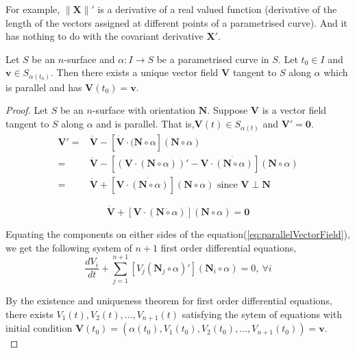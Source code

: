 	For example, $\|\mathbf{X}\|'$ is a derivative of a real valued function (derivative of the length of the vectors assigned at different points of a parametrised curve). And it has nothing to do with the covariant derivative $\mathbf{X}'$.

\begin{theorem}
	Let $S$ be an $n$-surface and $\alpha : I \to S$ be a parametrised curve in $S$. Let $t_0 \in I$ and $\mathbf{v} \in S_{\alpha(t_0)}$. Then there exists a unique vector field $\mathbf{V}$ tangent to $S$ along $\alpha$ which is parallel and has $\mathbf{V}(t_0) = \mathbf{v}$.
\end{theorem}
\begin{proof}
	Let $S$ be an $n$-surface with orientation $\mathbf{N}$. Suppose $\mathbf{V}$ is a vector field tangent to $S$ along $\alpha$ and is parallel. That is,$\mathbf{V}(t) \in S_{\alpha(t)}$ and $\mathbf{V}' = \mathbf{0}$.
\begin{align*}
	\mathbf{V}' = & \dot{\mathbf{V}} - \left[ \dot{\mathbf{V}} \cdot (\mathbf{N} \circ \alpha \right] (\mathbf{N} \circ \alpha) \\
	= & \dot{\mathbf{V}} - \left[ \left(\mathbf{V} \cdot (\mathbf{N} \circ \alpha) \right)' - \mathbf{V} \cdot \dot{(\mathbf{N} \circ \alpha)} \right] (\mathbf{N} \circ \alpha) \\
	= & \dot{\mathbf{V}} + \left[ \mathbf{V} \cdot \dot{(\mathbf{N} \circ \alpha)} \right] (\mathbf{N} \circ \alpha) \text{ since } \mathbf{V} \perp \mathbf{N}
\end{align*}

\begin{equation}
	\dot{\mathbf{V}} + \left[ \mathbf{V} \cdot (\mathbf{N} \dot{\circ} \alpha) \right] (\mathbf{N} \circ \alpha) = \mathbf{0}
	\label{eq:parallelVectorField}
\end{equation}

	Equating the components on either sides of the equation(\ref{eq:parallelVectorField}), we get the following system of $n+1$ first order differential equations,
\begin{equation}
	\dfrac{dV_i}{dt} + \sum_{j = 1}^{n+1} \left[ V_j(\mathbf{N}_j \circ \alpha)' \right](\mathbf{N}_i \circ \alpha) = 0,\ \forall i
\end{equation}
	
	By the existence and uniqueness theorem for first order differential equations, there exists $V_1(t), V_2(t), \dots, V_{n+1}(t)$ satisfying the sytem of equations with initial condition $\mathbf{V}(t_0) = \left( \alpha(t_0), V_1(t_0), V_2(t_0),\dots,V_{n+1}(t_0) \right) = \mathbf{v}$.\\


\end{proof}
